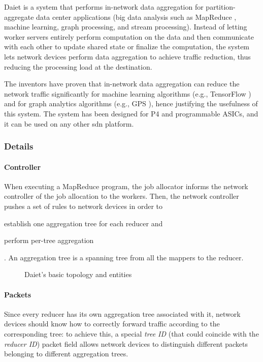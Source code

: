 Daiet \cite{daiet} is a system that performs in-network data aggregation for partition\hyp{}aggregate data center applications (big data analysis such as MapReduce \cite{mapreduce}, machine learning, graph processing, and stream processing).
Instead of letting worker servers entirely perform computation on the data and then communicate with each other to update shared state or finalize the computation, the system lets network devices perform data aggregation to achieve traffic reduction, thus reducing the processing load at the destination.\par
The inventors have proven that in-network data aggregation can reduce the network traffic significantly for machine learning algorithms (e.g., TensorFlow \cite{tensorflow}) and for graph analytics algorithms (e.g., GPS \cite{gps}), hence justifying the usefulness of this system. The system has been designed for P4 \cite{p4} and programmable ASICs, and it can be used on any other \gls{sdn} platform.

\subsubsection{Details}
\paragraph{Controller}
When executing a MapReduce program, the job allocator informs the network controller of the job allocation to the workers.
Then, the network controller pushes a set of rules to network devices in order to
\begin{mylist}
    \item establish one aggregation tree for each reducer and
    \item perform per-tree aggregation
\end{mylist}.
An aggregation tree is a spanning tree from all the mappers to the reducer.

\begin{figure}[!htb]
    \centering
    \usebox{\daietbasic}
    \caption{Daiet's \texorpdfstring{\cite{daiet}}{} basic topology and entities}
\end{figure}

\paragraph{Packets}
Since every reducer has its own aggregation tree associated with it, network devices should know how to correctly forward traffic according to the corresponding tree: to achieve this, a special \textit{tree ID} (that could coincide with the \textit{reducer ID}) packet field allows network devices to distinguish different packets belonging to different aggregation trees.

